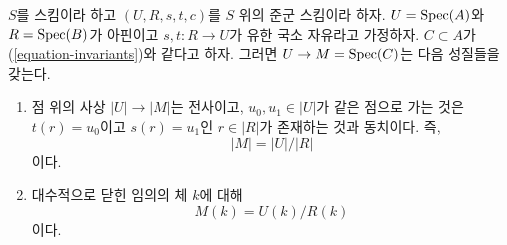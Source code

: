 \begin{lemma}
\label{lemma-points}
$S$를 스킴이라 하고 $(U, R, s, t, c)$를 $S$ 위의 준군 스킴이라 하자. $U = \mathop{\mathrm{Spec}}(A)$와 $R = \mathop{\mathrm{Spec}}(B)$가
아핀이고 $s, t : R \to U$가 유한 국소 자유라고 가정하자. $C \subset A$가 (\ref{equation-invariants})와 같다고 하자.
그러면 $U \to M = \mathop{\mathrm{Spec}}(C)$는 다음 성질들을 갖는다.
\begin{enumerate}
\item 점 위의 사상 $|U| \to |M|$는 전사이고, $u_0, u_1 \in |U|$가 같은 점으로 가는 것은
$t(r) = u_0$이고 $s(r) = u_1$인 $r \in |R|$가 존재하는 것과 동치이다. 즉,
$$
|M| = |U|/|R|
$$
이다.
\item 대수적으로 닫힌 임의의 체 $k$에 대해
$$
M(k) = U(k)/R(k)
$$
이다.
\end{enumerate}
\end{lemma}

